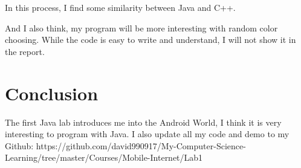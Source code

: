\documentclass{article}
\begin{document}
	In this process, I find some similarity between Java and C++. 
	
	And I also think, my program will be more interesting with random color choosing. While the code is easy to write and understand, I will not show it in the report.
	
	\section{Conclusion}
	The first Java lab introduces me into the Android World, I think it is very interesting to program with Java. I also update all my code and demo to my Github: https://github.com/david990917/My-Computer-Science-Learning/tree/master/Courses/Mobile-Internet/Lab1
	
	
	
	
\end{document}
